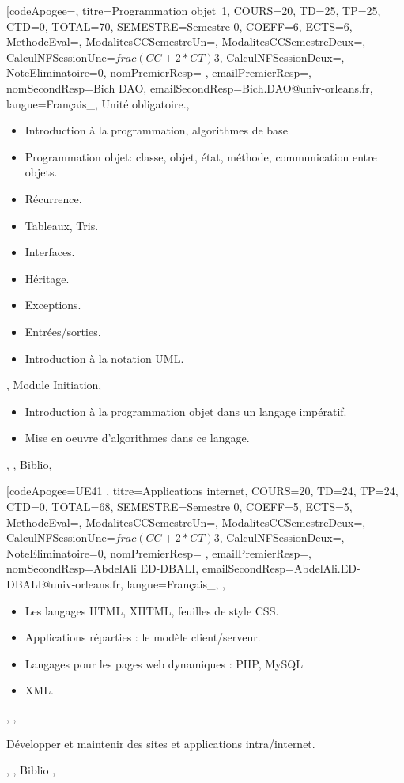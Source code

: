 \vfill


\module[codeApogee={},
titre={Programmation objet 1},
COURS={20},
TD={25},
TP={25},
CTD={0},
TOTAL={70},
SEMESTRE={Semestre 0},
COEFF={6},
ECTS={6},
MethodeEval={},
ModalitesCCSemestreUn={},
ModalitesCCSemestreDeux={},
CalculNFSessionUne={$frac{(CC+2*CT)}{3}$},
CalculNFSessionDeux={},
NoteEliminatoire={0},
nomPremierResp={ },
emailPremierResp={},
nomSecondResp={Bich DAO},
emailSecondResp={Bich.DAO@univ-orleans.fr},
langue={Français_},
{Unité obligatoire.},
{\begin{itemize}
\item Introduction à la programmation, algorithmes de base
  \item Programmation objet: classe, objet, état, méthode, communication entre objets.
  \item Récurrence. 
  \item Tableaux, Tris.
  \item Interfaces.
  \item Héritage.
  \item Exceptions.
  \item Entrées/sorties.
  \item Introduction à la notation UML.
\end{itemize}},
{Module Initiation},
{\begin{itemize}
\item Introduction à la programmation objet dans un langage impératif. 
  \item Mise en oeuvre d'algorithmes dans ce langage.
\end{itemize}},
{},
{Biblio},

\vfill


\module[codeApogee={UE41 },
titre={Applications internet},
COURS={20},
TD={24},
TP={24},
CTD={0},
TOTAL={68},
SEMESTRE={Semestre 0},
COEFF={5},
ECTS={5},
MethodeEval={},
ModalitesCCSemestreUn={},
ModalitesCCSemestreDeux={},
CalculNFSessionUne={$frac{(CC+2*CT)}{3}$},
CalculNFSessionDeux={},
NoteEliminatoire={0},
nomPremierResp={ },
emailPremierResp={},
nomSecondResp={AbdelAli ED-DBALI},
emailSecondResp={AbdelAli.ED-DBALI@univ-orleans.fr},
langue={Français_},
{},
{\begin{itemize}

 
  \item Les langages HTML, XHTML, feuilles de style CSS.
  \item Applications réparties : le modèle client/serveur.
  \item Langages pour les pages web dynamiques : PHP, MySQL
  \item XML. 
 

\end{itemize}},
{
},
{\begin{itemize}
 
  \ObjItem Développer et maintenir des sites et applications intra/internet.
 

\end{itemize}},
{},
{Biblio
},

